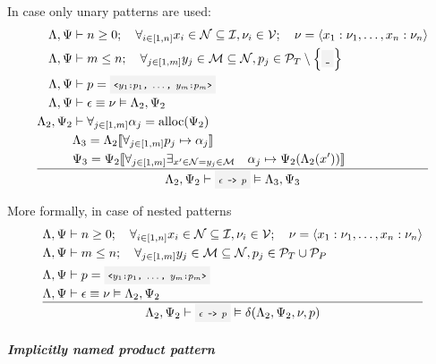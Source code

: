 In case only unary patterns are used:
\[
	\oprule[aligned]{
		\EnvLoc,\EnvStore     &\then n \geq 0 \semiq \forall_{i\in[1,n]}{x_i\in\mathcal{N}\subseteq\Id, \val_i\in\Val} \semiq \val = \tuple{x_1:\val_1,\dotsc,x_n:\val_n} \\*
		\EnvLoc,\EnvStore     &\then m \leq n \semiq \forall_{j\in[1,m]}{y_j\in\mathcal{M}\subseteq\mathcal{N},\pattern_j\in\PatternTerminal\setminus\set{\code{\_}}} \\*
		\EnvLoc,\EnvStore     &\then \pattern = \code{<$y_1$:$\pattern_1$, $\dotsc$, $y_m$:$\pattern_m$>} \\*
		\EnvLoc,\EnvStore     &\then \expr \eval \val \Then \EnvLoc_2,\EnvStore_2 \\*
		\EnvLoc_2,\EnvStore_2 &\then \forall_{j\in[1,m]}{\addr_j = \alloc(\EnvStore_2)} \\*
		                      &\EnvLoc_3   = \EnvLoc_2\env{\forall_{j\in[1,m]}{\pattern_j\mapsto\addr_j}}\\*
		                      &\EnvStore_3 = \EnvStore_2\env{\forall_{j\in[1,m]}{\exists_{x'\in\mathcal{N}=y_j\in\mathcal{M}}{\quad\addr_j\mapsto\EnvStore_2(\EnvLoc_2(x'))}}}\\*
	}{
		\EnvLoc_2,\EnvStore_2 \then \code{$\expr$ -> $\pattern$} \Then \EnvLoc_3,\EnvStore_3\\*
	}
\]


\vspace{\baselineskip}

More formally, in case of nested patterns
\[
	\oprule[aligned]{
		\EnvLoc,\EnvStore  &\then n \geq 0 \semiq \forall_{i\in[1,n]}{x_i\in\mathcal{N}\subseteq\Id, \val_i\in\Val} \semiq \val = \tuple{x_1:\val_1,\dotsc,x_n:\val_n} \\*
		\EnvLoc,\EnvStore  &\then m \leq n \semiq \forall_{j\in[1,m]}{y_j\in\mathcal{M}\subseteq\mathcal{N},\pattern_j\in\PatternTerminal\cup\PatternProduct} \\*
		\EnvLoc,\EnvStore  &\then \pattern = \code{<$y_1$:$\pattern_1$, $\dotsc$, $y_m$:$\pattern_m$>} \\*
		\EnvLoc,\EnvStore  &\then \expr \eval \val \Then \EnvLoc_2,\EnvStore_2 \\*
	}{
		\EnvLoc_2,\EnvStore_2 \then \code{$\expr$ -> $\pattern$} \Then \decons(\EnvLoc_2,\EnvStore_2,\val,\pattern)
	}
\]

\subparagraph{Implicitly named product pattern}

